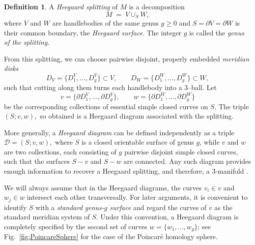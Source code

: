 \documentclass[pdflatex,sn-mathphys-num]{sn-jnl}%
\theoremstyle{plain}
\theoremstyle{definition}
\newtheorem{definition}[theorem]{Definition}
\theoremstyle{remark}
\newtheorem*{remark}{Remark}
\begin{document}
\begin{definition}
A \emph{Heegaard splitting} of $M$ is a decomposition
$$
M \;=\; V \cup_S W ,
$$
where $V$ and $W$ are handlebodies of the same genus $g\ge 0$ and
$S = \partial V = \partial W$ is their common boundary, the
\emph{Heegaard surface}.  
The integer $g$ is called the \emph{genus of the splitting}.


From this splitting, we can choose pairwise disjoint, properly embedded \emph{meridian disks}
$$
D_V = \{D^V_1,\dots,D^V_g\}\subset V, 
\qquad
D_W = \{D^W_1,\dots,D^W_g\}\subset W,
$$
such that cutting along them turns each handlebody into a $3$–ball. Let
$$
v = \{\partial D^V_1,\dots,\partial D^V_g\},
\qquad
w = \{\partial D^W_1,\dots,\partial D^W_g\}
$$
be the corresponding collections of essential simple closed curves on
$S$.  
The triple
$
(S; v, w),
$
so obtained is a Heegaard diagram associated with the splitting. 

More generally, a \emph{Heegaard diagram} can be defined independently as a triple
$
\mathcal D = (S; v, w),
$
where $S$ is a closed orientable surface of genus $g$, while $v$ and $w$ are two collections, each consisting of $g$ pairwise disjoint simple closed curves, such that the surfaces $S-v$ and $S-w$ are connected.
Any such diagram provides enough information to recover a Heegaard splitting, and therefore, a $3$-manifold \cite[Remark 6.2.2.]{Schultens2014p}.

We will always assume that in the Heegaard diagrams, the curves $v_i\in v$ and $w_j\in w$ intersect each other transversally. For later arguments, it is convenient to identify $S$ with a
\emph{standard genus-$g$ surface} and regard the curves of $v$ as the {standard} meridian system of $S$.
Under this convention, a Heegaard diagram is completely specified by the
second set of curves $w=\{w_1,\dots ,w_g\}$; see
Fig.~\ref{fig:PoincareSphere} for the case of the Poincaré homology sphere.
\end{definition}


\end{document}
